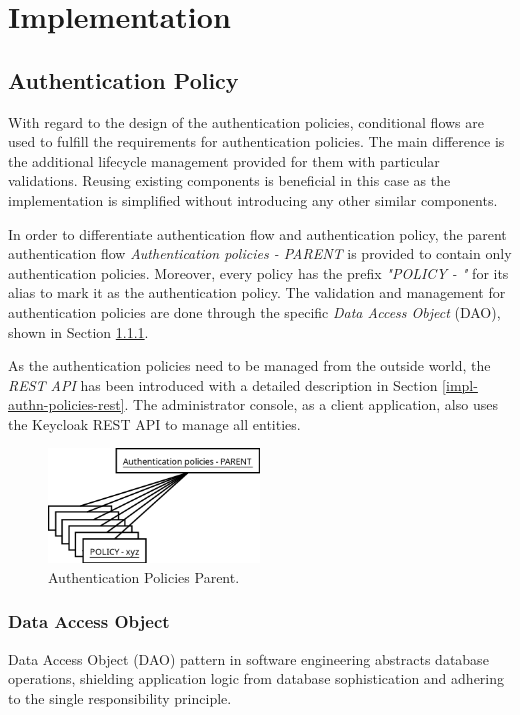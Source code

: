 \chapter{Implementation} \label{implementation}

\section{Authentication Policy}
With regard to the design of the authentication policies, conditional flows are used to fulfill the requirements for authentication policies.
The main difference is the additional lifecycle management provided for them with particular validations.
Reusing existing components is beneficial in this case as the implementation is simplified without introducing any other similar components.

In order to differentiate authentication flow and authentication policy, the parent authentication flow \textit{Authentication policies - PARENT} is provided to contain only authentication policies.
Moreover, every policy has the prefix \textit{"POLICY - "} for its alias to mark it as the authentication policy.
The validation and management for authentication policies are done through the specific \textit{Data Access Object} (DAO), shown in Section \ref{impl-authn-policies-dao}. 

As the authentication policies need to be managed from the outside world, the \textit{REST API} has been introduced with a detailed description in Section \ref{impl-authn-policies-rest}.
The administrator console, as a client application, also uses the Keycloak REST API to manage all entities.

\begin{figure}[htbp]
  \centering
  \includegraphics[width=0.5\textwidth]{img/sections/6-implementation/auth-policies-parent.png}
  \caption{Authentication Policies Parent.}
  \label{fig:impl-authn-policies-parent}
\end{figure}

\newpage

\subsection{Data Access Object} \label{impl-authn-policies-dao}
Data Access Object (DAO) pattern in software engineering abstracts database operations, shielding application logic from database sophistication and adhering to the single responsibility principle.\cite{impl-dao}


